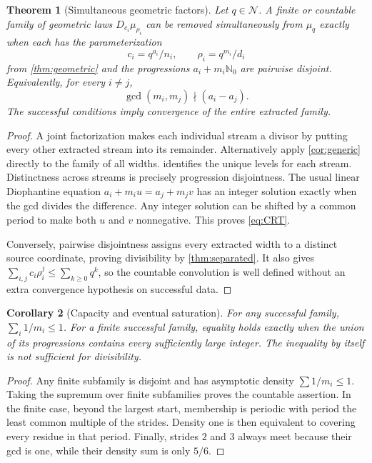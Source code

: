 \documentclass[11pt,letterpaper]{article}
\newtheorem{theorem}{Theorem}[section]
\newtheorem{corollary}[theorem]{Corollary}
\theoremstyle{definition}
\theoremstyle{remark}
\newcommand{\N}{\mathbb N_0}
\newcommand{\NR}{\mathcal N}
\numberwithin{equation}{section}
\begin{document}
\begin{theorem}[Simultaneous geometric factors]\label{thm:streams}
Let $q\in\NR$. A finite or countable family of geometric laws $D_{c_i}\mu_{\rho_i}$ can be removed simultaneously from $\mu_q$ exactly when each has the parameterization
\[
 c_i=q^{a_i}/n_i,\qquad \rho_i=q^{m_i}/d_i
\]
from \cref{thm:geometric} and the progressions $a_i+m_i\N$ are pairwise disjoint. Equivalently, for every $i\ne j$,
\begin{equation}\label{eq:CRT}
 \gcd(m_i,m_j)\nmid(a_i-a_j).
\end{equation}
The successful conditions imply convergence of the entire extracted family.
\end{theorem}
\begin{proof}
A joint factorization makes each individual stream a divisor by putting every other extracted stream into its remainder. Alternatively apply \cref{cor:generic} directly to the family of all widths.  identifies the unique levels for each stream. Distinctness across streams is precisely progression disjointness. The usual linear Diophantine equation
$a_i+m_i u=a_j+m_j v$ has an integer solution exactly when the gcd divides the difference. Any integer solution can be shifted by a common period to make both $u$ and $v$ nonnegative. This proves \eqref{eq:CRT}.

Conversely, pairwise disjointness assigns every extracted width to a distinct source coordinate, proving divisibility by \cref{thm:separated}. It also gives
$\sum_{i,j}c_i\rho_i^j\le\sum_{k\ge0}q^k$, so the countable convolution is well defined without an extra convergence hypothesis on successful data.
\end{proof}

\begin{corollary}[Capacity and eventual saturation]\label{cor:density}
For any successful family, $\sum_i1/m_i\le1$. For a finite successful family, equality holds exactly when the union of its progressions contains every sufficiently large integer. The inequality by itself is not sufficient for divisibility.
\end{corollary}
\begin{proof}
Any finite subfamily is disjoint and has asymptotic density $\sum1/m_i\le1$. Taking the supremum over finite subfamilies proves the countable assertion. In the finite case, beyond the largest start, membership is periodic with period the least common multiple of the strides. Density one is then equivalent to covering every residue in that period. Finally, strides $2$ and $3$ always meet because their gcd is one, while their density sum is only $5/6$.
\end{proof}
\end{document}
